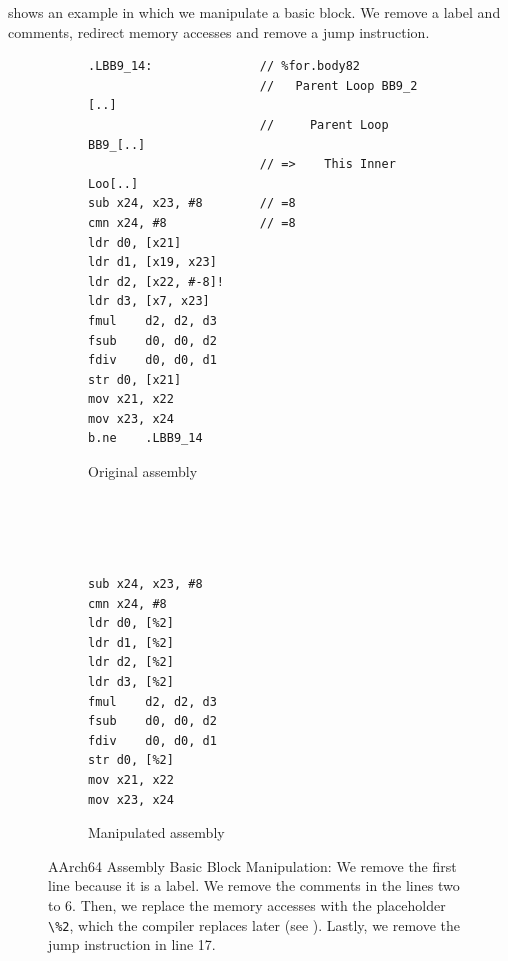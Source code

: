  shows an example in which we manipulate a basic block.
We remove a label and comments, redirect memory accesses and remove a jump instruction.
\begin{figure}
    \begin{subfigure}{0.65\textwidth}
        \begin{lstlisting}
.LBB9_14:               // %for.body82
                        //   Parent Loop BB9_2 [..]
                        //     Parent Loop BB9_[..]
                        // =>    This Inner Loo[..]
sub	x24, x23, #8        // =8
cmn	x24, #8             // =8
ldr	d0, [x21]
ldr	d1, [x19, x23]
ldr	d2, [x22, #-8]!
ldr	d3, [x7, x23]
fmul	d2, d2, d3
fsub	d0, d0, d2
fdiv	d0, d0, d1
str	d0, [x21]
mov	x21, x22
mov	x23, x24
b.ne	.LBB9_14
        \end{lstlisting}
        \caption{Original assembly}
    \end{subfigure}
    \hfill
    \begin{subfigure}{0.3\textwidth}
        \begin{lstlisting}[showlines=true]




sub	x24, x23, #8
cmn	x24, #8
ldr	d0, [%2]
ldr	d1, [%2]
ldr	d2, [%2]
ldr	d3, [%2]
fmul	d2, d2, d3
fsub	d0, d0, d2
fdiv	d0, d0, d1
str	d0, [%2]
mov	x21, x22
mov	x23, x24

        \end{lstlisting}
        \caption{Manipulated assembly}
    \end{subfigure}
    \caption[Assembly Basic Block Manipulation]{AArch64 Assembly Basic Block Manipulation:
    We remove the first line because it is a label.
    We remove the comments in the lines two to 6.
    Then, we replace the memory accesses with the placeholder \lstinline|\%2|, which the compiler replaces later (see ).
    Lastly, we remove the jump instruction in line 17.}
    \label{fig:approach:bb-cleaning}
\end{figure}


